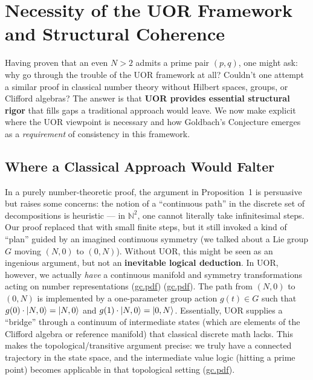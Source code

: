 \documentclass[12pt]{article}
\begin{document}
\section{Necessity of the UOR Framework and Structural Coherence}
 
Having proven that an even $N>2$ admits a prime pair $(p,q)$, one might ask: why go through the trouble of the UOR framework at all? Couldn’t one attempt a similar proof in classical number theory without Hilbert spaces, groups, or Clifford algebras? The answer is that \textbf{UOR provides essential structural rigor} that fills gaps a traditional approach would leave. We now make explicit where the UOR viewpoint is necessary and how Goldbach’s Conjecture emerges as a \emph{requirement} of consistency in this framework.

\subsection{Where a Classical Approach Would Falter}
In a purely number-theoretic proof, the argument in Proposition~1 is persuasive but raises some concerns: the notion of a “continuous path” in the discrete set of decompositions is heuristic --- in $\mathbb{N}^2$, one cannot literally take infinitesimal steps. Our proof replaced that with small finite steps, but it still invoked a kind of “plan” guided by an imagined continuous symmetry (we talked about a Lie group $G$ moving $(N,0)$ to $(0,N)$). Without UOR, this might be seen as an ingenious argument, but not an \textbf{inevitable logical deduction}. In UOR, however, we actually \emph{have} a continuous manifold and symmetry transformations acting on number representations (\href{file://file-7ZYYwSHWVa83XEVTrEhg5z#:~:text=The%20Clifford%20algebra%20provides%20a,Because%20the%20Clifford%20algebra}{gc.pdf}) (\href{file://file-7ZYYwSHWVa83XEVTrEhg5z#:~:text=%24G%24%20action%20mixing%20%24N%24%20and,UOR%20realization%20of%20the%20%24G}{gc.pdf}). The path from $(N,0)$ to $(0,N)$ is implemented by a one-parameter group action $g(t)\in G$ such that $g(0)\cdot\ket{N,0} = \ket{N,0}$ and $g(1)\cdot\ket{N,0} = \ket{0,N}$. Essentially, UOR supplies a “bridge” through a continuum of intermediate states (which are elements of the Clifford algebra or reference manifold) that classical discrete math lacks. This makes the topological/transitive argument precise: we truly have a connected trajectory in the state space, and the intermediate value logic (hitting a prime point) becomes applicable in that topological setting (\href{file://file-7ZYYwSHWVa83XEVTrEhg5z#:~:text=the%20intersection%20of%20the%20prime,sprinkled%20throughout%2C%20and%20by%20the}{gc.pdf}).
\end{document}
